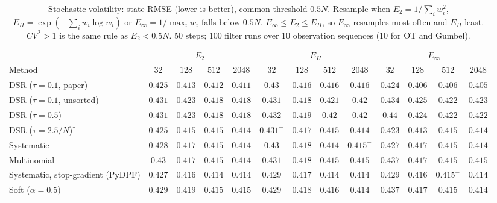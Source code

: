 \begin{table}[ht]
\centering
\small
\caption{Stochastic volatility: state RMSE (lower is better), common threshold $0.5N$. Resample when $E_2=1/\sum_iw_i^2$, $E_H=\exp(-\sum_iw_i\log w_i)$ or $E_\infty=1/\max_iw_i$ falls below $0.5N$. $E_\infty\le E_2\le E_H$, so $E_\infty$ resamples most often and $E_H$ least. $CV^2>1$ is the same rule as $E_2<0.5N$. 50 steps; 100 filter runs over 10 observation sequences (10 for OT and Gumbel).}
\label{tab:trigger-fixed-volatility-rmse}
\begin{adjustbox}{max width=\linewidth}
\begin{tabular}{lcccc|cccc|cccc}
\toprule
 & \multicolumn{4}{c}{$E_2$} & \multicolumn{4}{c}{$E_H$} & \multicolumn{4}{c}{$E_\infty$} \\
\cmidrule(lr){2-5} \cmidrule(lr){6-9} \cmidrule(lr){10-13}
Method & $32$ & $128$ & $512$ & $2048$ & $32$ & $128$ & $512$ & $2048$ & $32$ & $128$ & $512$ & $2048$ \\
\midrule
DSR ($\tau{=}0.1$, paper) & $0.425$ & $0.413$ & $0.412$ & $0.411$ & $0.43$ & $0.416$ & $0.416$ & $0.416$ & $\mathbf{0.424}$ & $\mathbf{0.406}$ & $\mathbf{0.406}$ & $\mathbf{0.405}$ \\
DSR ($\tau{=}0.1$, unsorted) & $\mathbf{0.431}$ & $0.423$ & $\mathbf{0.418}$ & $\mathbf{0.418}$ & $0.431$ & $\mathbf{0.418}$ & $0.421$ & $0.42$ & $0.434$ & $0.425$ & $0.422$ & $0.423$ \\
DSR ($\tau{=}0.5$) & $\mathbf{0.431}$ & $0.423$ & $\mathbf{0.418}$ & $\mathbf{0.418}$ & $0.432$ & $\mathbf{0.419}$ & $0.42$ & $0.42$ & $0.44$ & $0.424$ & $0.422$ & $0.422$ \\
DSR ($\tau{=}2.5/N$)$^\dagger$ & $0.425$ & $0.415$ & $0.415$ & $0.414$ & $0.431^{-}$ & $0.417$ & $0.415$ & $0.414$ & $\mathbf{0.423}$ & $\mathbf{0.413}$ & $\mathbf{0.415}$ & $\mathbf{0.414}$ \\
\midrule
Systematic & $0.428$ & $0.417$ & $0.415$ & $\mathbf{0.414}$ & $0.43$ & $0.418$ & $\mathbf{0.414}$ & $0.415^{-}$ & $\mathbf{0.427}$ & $\mathbf{0.417}$ & $0.415$ & $0.414$ \\
Multinomial & $\mathbf{0.43}$ & $0.417$ & $\mathbf{0.415}$ & $\mathbf{0.414}$ & $0.431$ & $0.418$ & $0.415$ & $0.415$ & $0.437$ & $\mathbf{0.417}$ & $0.415$ & $0.415$ \\
Systematic, stop-gradient (PyDPF) & $\mathbf{0.427}$ & $0.416$ & $\mathbf{0.414}$ & $0.414$ & $0.429$ & $0.417$ & $0.414$ & $0.414$ & $0.429$ & $\mathbf{0.416}$ & $0.415^{-}$ & $\mathbf{0.414}$ \\
Soft ($\alpha{=}0.5$) & $\mathbf{0.429}$ & $0.419$ & $0.415$ & $0.415$ & $0.429$ & $0.418$ & $0.416$ & $0.414$ & $0.437$ & $\mathbf{0.417}$ & $\mathbf{0.415}$ & $\mathbf{0.414}$ \\

\end{tabular}
\end{adjustbox}
\end{table}
